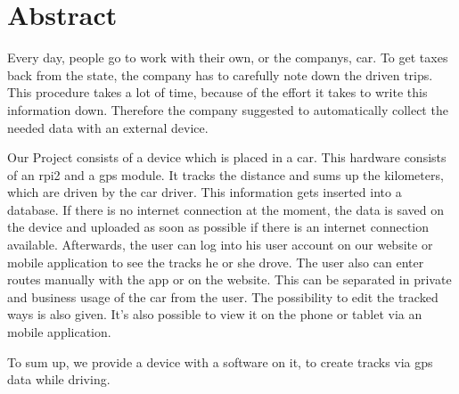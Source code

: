 \chapter*{Abstract}
Every day, people go to work with their own, or the companys, car. To get taxes back from the state, the company has to carefully note down the driven trips. This procedure takes a lot of time,  because of the effort it takes to write this information down. Therefore the company suggested to automatically collect the needed data with an external device.\newline

Our Project consists of a device which is placed in a car. This hardware consists of an \gls{rpi2} and a \gls{gps} module. It tracks the distance and sums up the kilometers, which are driven by the car driver. This information gets inserted into a database. If there is no internet connection at the moment, the data is saved on the device and uploaded as soon as possible if there is an internet connection available. Afterwards, the user can log into his user account on our website or mobile application to see the tracks he or she drove. The user also can enter routes manually with the app or on the website. This can be separated in private and business usage of the car from the user. The possibility to edit the tracked ways is also given. It's also possible to view it on the phone or tablet via an mobile application.\newline

To sum up, we provide a device with a software on it, to create tracks via \gls{gps} data while driving.
\clearpageauthor